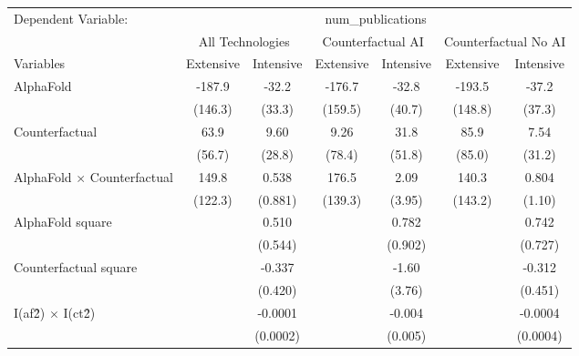 \begingroup
\centering
\begin{tabular}{lcccccc}
   \tabularnewline \midrule \midrule
   Dependent Variable: & \multicolumn{6}{c}{num\_publications}\\
 & \multicolumn{2}{c}{All Technologies} & \multicolumn{2}{c}{Counterfactual AI} & \multicolumn{2}{c}{Counterfactual No AI} \\
\cmidrule(lr){1-1}\cmidrule(lr){2-3} \cmidrule(lr){4-5} \cmidrule(lr){6-7}
Variables & \multicolumn{1}{c}{Extensive} & \multicolumn{1}{c}{Intensive} & \multicolumn{1}{c}{Extensive} & \multicolumn{1}{c}{Intensive} & \multicolumn{1}{c}{Extensive} & \multicolumn{1}{c}{Intensive} \\
\cmidrule(lr){1-1}\cmidrule(lr){2-2} \cmidrule(lr){3-3} \cmidrule(lr){4-4} \cmidrule(lr){5-5} \cmidrule(lr){6-6} \cmidrule(lr){7-7}
   AlphaFold                          & -187.9    & -32.2     & -176.7    & -32.8     & -193.5    & -37.2\\   
                                      & (146.3)   & (33.3)    & (159.5)   & (40.7)    & (148.8)   & (37.3)\\   
   Counterfactual                     & 63.9      & 9.60      & 9.26      & 31.8      & 85.9      & 7.54\\   
                                      & (56.7)    & (28.8)    & (78.4)    & (51.8)    & (85.0)    & (31.2)\\   
   AlphaFold $\times$ Counterfactual  & 149.8     & 0.538     & 176.5     & 2.09      & 140.3     & 0.804\\   
                                      & (122.3)   & (0.881)   & (139.3)   & (3.95)    & (143.2)   & (1.10)\\   
   AlphaFold square                   &           & 0.510     &           & 0.782     &           & 0.742\\   
                                      &           & (0.544)   &           & (0.902)   &           & (0.727)\\   
   Counterfactual square              &           & -0.337    &           & -1.60     &           & -0.312\\   
                                      &           & (0.420)   &           & (3.76)    &           & (0.451)\\   
   I(af\^2) $\times$ I(ct\^2)         &           & -0.0001   &           & -0.004    &           & -0.0004\\   
                                      &           & (0.0002)  &           & (0.005)   &           & (0.0004)\\   

\end{tabular}
